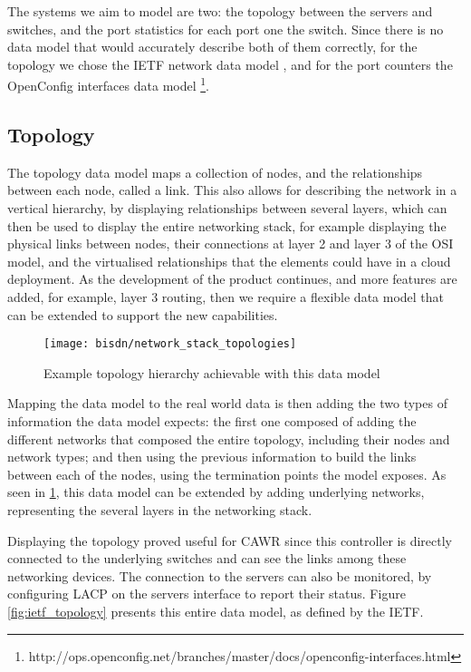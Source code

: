 \par The systems we aim to model are two: the topology between the servers and switches, and the port statistics for each port one the switch. Since there is no 
data model that would accurately describe both of them correctly, for the topology we chose the IETF network data model  \cite{clemm_data_2017}, and for the port
counters the OpenConfig interfaces data model \footnote {http://ops.openconfig.net/branches/master/docs/openconfig-interfaces.html}.

\subsection {Topology}

The topology data model maps a collection of nodes, and the relationships between each node, called a link. This also allows for describing the network in a vertical
hierarchy, by displaying relationships between several layers, which can then be used to display the entire networking stack, for example displaying the physical
links between nodes, their connections at layer 2 and layer 3 of the OSI model, and the virtualised relationships that the elements could have in a cloud deployment.
As the development of the product continues, and more features are added, for example, layer 3 routing, then we require a flexible data model that can be extended to
support the new capabilities.

\begin{figure} [!htbp]
    \centering
    \texttt{[image: bisdn/network\_stack\_topologies]}
    \caption{Example topology hierarchy achievable with this data model \cite{clemm_data_2017}}
    \label{fig:netconf_stack}
\end{figure}

\par Mapping the data model to the real world data is then adding the two types of information the data model expects: the first one composed of adding the different
networks that composed the entire topology, including their nodes and network types; and then using the previous information to build the links between each of the
nodes, using the termination points the model exposes. As seen in \ref{fig:netconf_stack}, this data model can be extended by adding underlying networks, 
representing the several layers in the networking stack.

\par Displaying the topology proved useful for CAWR since this controller is directly connected to the underlying switches and can see the links among these
networking devices. The connection to the servers can also be monitored, by configuring LACP on the servers interface to report their status. Figure 
\ref{fig:ietf_topology} presents this entire data model, as defined by the IETF.

